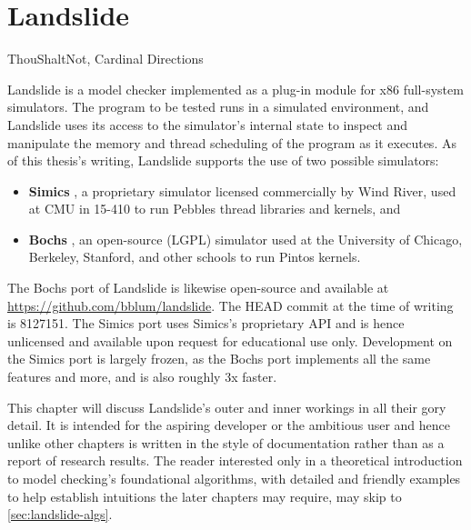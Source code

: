 \chapter{Landslide}
\label{chap:landslide}

{ThouShaltNot, Cardinal Directions}

Landslide is a model checker implemented as a plug-in module for x86 full-system simulators.
The program to be tested runs in a simulated environment,
and Landslide uses its access to the simulator's internal state to inspect and manipulate the memory and thread scheduling of the program as it executes.
As of this thesis's writing, Landslide supports the use of two possible simulators:

\begin{itemize}
	\item {\bf Simics} \cite{simics}, a proprietary simulator licensed commercially by Wind River, used at CMU in 15-410 to run Pebbles thread libraries and kernels, and
	\item {\bf Bochs} \cite{bochs}, an open-source (LGPL) simulator used at the University of Chicago, Berkeley, Stanford, and other schools to run Pintos kernels.
\end{itemize}

The Bochs port of Landslide is likewise open-source
and available at \url{https://github.com/bblum/landslide}.
The HEAD commit at the time of writing is 8127151.
The Simics port uses Simics's proprietary API and is hence unlicensed and available upon request for educational use only.
Development on the Simics port is largely frozen,
as the Bochs port implements all the same features and more,
and is also roughly 3x faster.

This chapter will discuss Landslide's outer and inner workings in all their gory detail.
It is intended for the aspiring developer or the ambitious user
and hence unlike other chapters is written in the style of documentation rather than as a report of research results.
The reader interested only in a theoretical introduction to model checking's foundational algorithms,
with detailed and friendly examples to help establish intuitions the later chapters may require,
may skip to \cref{sec:landslide-algs}.


